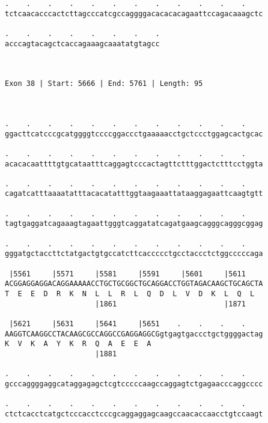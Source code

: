 \documentclass{article}
\begin{document}
\begin{Verbatim}
.    .    .    .    .    .    .    .    .    .    .    .    
tctcaacacccactcttagcccatcgccaggggacacacacagaattccagacaaagctc
                                                            
.    .    .    .    .    .    .    .
acccagtacagctcaccagaaagcaaatatgtagcc
                                    
                                    
 
Exon 38 | Start: 5666 | End: 5761 | Length: 95



.    .    .    .    .    .    .    .    .    .    .    .    
ggacttcatcccgcatggggtccccggaccctgaaaaacctgctccctggagcactgcac
                                                            
.    .    .    .    .    .    .    .    .    .    .    .    
acacacaattttgtgcataatttcaggagtcccactagttctttggactctttcctggta
                                                            
.    .    .    .    .    .    .    .    .    .    .    .    
cagatcatttaaaatatttacacatatttggtaagaaattataaggagaattcaagtgtt
                                                            
.    .    .    .    .    .    .    .    .    .    .    .    
tagtgaggatcagaaagtagaattgggtcaggatatcagatgaagcagggcagggcggag
                                                            
.    .    .    .    .    .    .    .    .    .    .    .    
gggatgctaccttctatgactgtgccatcttcaccccctgcctaccctctggcccccaga
                                                            
 |5561     |5571     |5581     |5591     |5601     |5611    
ACGGAGGAGGACAGGAAAAACCTGCTGCGGCTGCAGGACCTGGTAGACAAGCTGCAGCTA
T  E  E  D  R  K  N  L  L  R  L  Q  D  L  V  D  K  L  Q  L  
                     |1861                         |1871    
  
 |5621     |5631     |5641     |5651    .    .    .    .    
AAGGTCAAGGCCTACAAGCGCCAGGCCGAGGAGGCGgtgagtgaccctgctggggactag
K  V  K  A  Y  K  R  Q  A  E  E  A                          
                     |1881                                  
  
.    .    .    .    .    .    .    .    .    .    .    .    
gcccaggggaggcataggagagctcgtcccccaagccaggagtctgagaacccaggcccc
                                                            
.    .    .    .    .    .    .    .    .    .    .    .    
ctctcacctcatgctcccacctcccgcaggaggagcaagccaacaccaacctgtccaagt
                                                            

\end{Verbatim}
\end{document}
